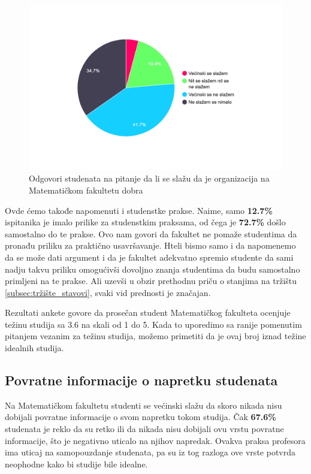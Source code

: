 \documentclass[a4paper]{article}
\begin{document}
\begin{figure}[h!]
\begin{center}
    \includegraphics[width=0.7\linewidth]{Slike/PieChartOrganizacijaMatfa.png}
    \caption{Odgovori studenata na pitanje da li se slažu da je organizacija na Matematičkom fakultetu dobra}
    \label{fig:organizacija_matf}
\end{center}
\end{figure}

Ovde ćemo takođe napomenuti i studenstke prakse. Naime, samo \textbf{12.7\%} ispitanika je imalo prilike za studenstkim praksama, od čega je \textbf{72.7\%} došlo samostalno do te prakse. Ovo nam govori da fakultet ne pomaže studentima da pronađu priliku za praktično usavršavanje. Hteli bismo samo i da napomenemo da se može dati argument i da je fakultet adekvatno spremio studente da sami nadju takvu priliku omogućivši dovoljno znanja studentima da budu samostalno primljeni na te prakse. Ali uzevši u obzir prethodnu priču o stanjima na tržištu \ref{subsec:tržište_stavovi}, svaki vid prednosti je značajan.

Rezultati ankete govore da prosečan student Matematičkog fakulteta ocenjuje težinu studija sa 3.6 na skali od 1 do 5. Kada to uporedimo sa ranije pomenutim pitanjem vezanim za težinu studija, možemo primetiti da je ovaj broj iznad težine idealnih studija.


\subsection{Povratne informacije o napretku studenata}
\label{subsec:napredak_iskustva}
Na Matematičkom fakultetu studenti se većinski slažu da skoro nikada nisu dobijali povratne informacije o svom napretku tokom studija. Čak \textbf{67.6\%} studenata je reklo da su retko ili da nikada nisu dobijali ovu vrstu povratne informacije, što je negativno uticalo na njihov napredak. Ovakva praksa profesora ima uticaj na samopouzdanje studenata, pa su iz tog razloga ove vrste potvrda neophodne kako bi studije bile idealne.
\end{document}
